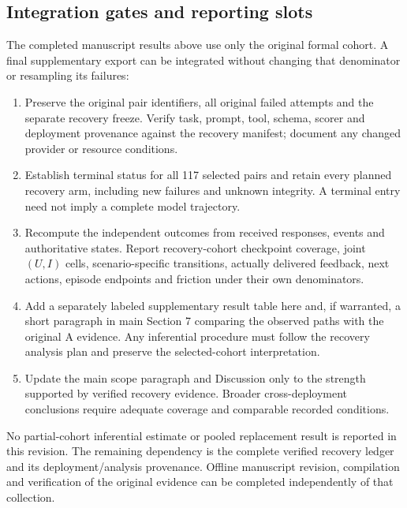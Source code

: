 \documentclass[11pt,a4paper]{article}
\begin{document}
\subsection{Integration gates and reporting slots}
The completed manuscript results above use only the original formal cohort. A final supplementary export can be integrated without changing that denominator or resampling its failures:
\begin{enumerate}[leftmargin=*,itemsep=3pt]
\item Preserve the original pair identifiers, all original failed attempts and the separate recovery freeze. Verify task, prompt, tool, schema, scorer and deployment provenance against the recovery manifest; document any changed provider or resource conditions.
\item Establish terminal status for all 117 selected pairs and retain every planned recovery arm, including new failures and unknown integrity. A terminal entry need not imply a complete model trajectory.
\item Recompute the independent outcomes from received responses, events and authoritative states. Report recovery-cohort checkpoint coverage, joint $(U,I)$ cells, scenario-specific transitions, actually delivered feedback, next actions, episode endpoints and friction under their own denominators.
\item Add a separately labeled supplementary result table here and, if warranted, a short paragraph in main Section 7 comparing the observed paths with the original A evidence. Any inferential procedure must follow the recovery analysis plan and preserve the selected-cohort interpretation.
\item Update the main scope paragraph and Discussion only to the strength supported by verified recovery evidence. Broader cross-deployment conclusions require adequate coverage and comparable recorded conditions.
\end{enumerate}
No partial-cohort inferential estimate or pooled replacement result is reported in this revision. The remaining dependency is the complete verified recovery ledger and its deployment/analysis provenance. Offline manuscript revision, compilation and verification of the original evidence can be completed independently of that collection.
\end{document}
